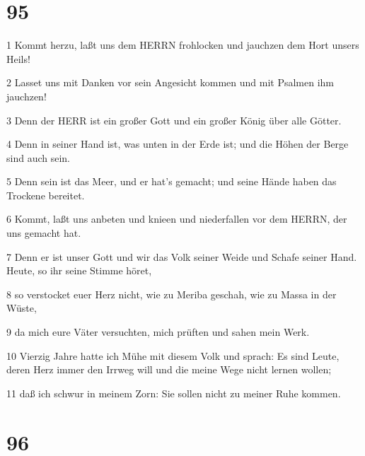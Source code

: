 \chapter{95}

\par 1 Kommt herzu, laßt uns dem HERRN frohlocken und jauchzen dem Hort unsers Heils!
\par 2 Lasset uns mit Danken vor sein Angesicht kommen und mit Psalmen ihm jauchzen!
\par 3 Denn der HERR ist ein großer Gott und ein großer König über alle Götter.
\par 4 Denn in seiner Hand ist, was unten in der Erde ist; und die Höhen der Berge sind auch sein.
\par 5 Denn sein ist das Meer, und er hat's gemacht; und seine Hände haben das Trockene bereitet.
\par 6 Kommt, laßt uns anbeten und knieen und niederfallen vor dem HERRN, der uns gemacht hat.
\par 7 Denn er ist unser Gott und wir das Volk seiner Weide und Schafe seiner Hand. Heute, so ihr seine Stimme höret,
\par 8 so verstocket euer Herz nicht, wie zu Meriba geschah, wie zu Massa in der Wüste,
\par 9 da mich eure Väter versuchten, mich prüften und sahen mein Werk.
\par 10 Vierzig Jahre hatte ich Mühe mit diesem Volk und sprach: Es sind Leute, deren Herz immer den Irrweg will und die meine Wege nicht lernen wollen;
\par 11 daß ich schwur in meinem Zorn: Sie sollen nicht zu meiner Ruhe kommen.

\chapter{96}

